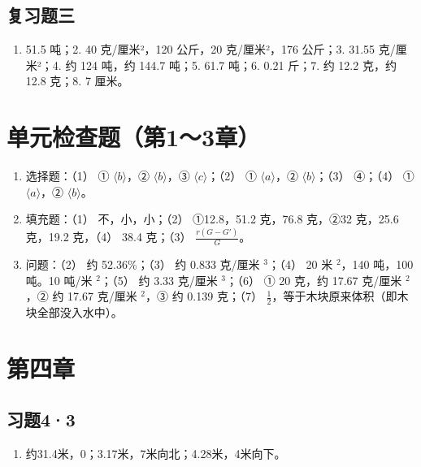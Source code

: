 \subsection{复习题三}\label{ux590dux4e60ux9898ux4e09-1}

\begin{enumerate}
\def\labelenumi{\arabic{enumi}.}
\tightlist
\item
  51.5 吨；2. 40 克/厘米²，120 公斤，20 克/厘米²，176 公斤；3. 31.55
  克/厘米²；4. 约 124 吨，约 144.7 吨；5. 61.7 吨；6. 0.21 斤；7. 约
  12.2 克，约 12.8 克；8. 7 厘米。
\end{enumerate}

\section{单元检查题（第1～3章）}\label{ux5355ux5143ux68c0ux67e5ux9898ux7b2c13ux7ae0-1}

\begin{enumerate}
\def\labelenumi{\arabic{enumi}.}
\item
  选择题：（1） ① \(\langle b\rangle\)，② \(\langle b\rangle\)，③
  \(\langle c\rangle\)；（2） ① \(\langle a\rangle\)，②
  \(\langle b\rangle\)；（3） ④；（4） ① \(\langle a\rangle\)，②
  \(\langle b\rangle\)。
\item
  填充题：（1） 不，小，小；（2） ①12.8，51.2 克，76.8 克，②32 克，25.6
  克，19.2 克，（4） 38.4 克；（3） \(\frac{r(G - G')}{G}\)。
\item
  问题：（2） 约 52.36\%；（3） 约 0.833 克/厘米 \(^{3}\)；（4） 20 米
  \(^{2}\)，140 吨，100 吨。10 吨/米 \(^{2}\)；（5） 约 3.33 克/厘米
  \(^{3}\)；（6） ① 20 克，约 17.67 克/厘米 \(^{2}\)，② 约 17.67 克/厘米
  \(^{2}\)，③ 约 0.139 克；（7）
  \(\frac{1}{2}\)，等于木块原来体积（即木块全部没入水中）。
\end{enumerate}

\section{第四章}\label{ux7b2cux56dbux7ae0}

\subsection{习题4·3}\label{ux4e60ux989843-1}

\begin{enumerate}
\def\labelenumi{\arabic{enumi}.}
\setcounter{enumi}{1}
\tightlist
\item
  约31.4米，0；3.17米，7米向北；4.28米，4米向下。
\end{enumerate}

